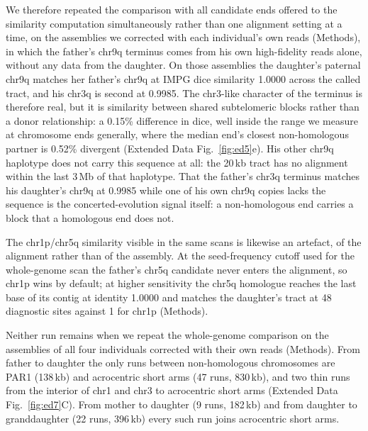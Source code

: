 \documentclass[pdflatex,mathphys]{jnl}
\begin{document}
We therefore repeated the comparison with all candidate ends offered to the similarity computation
simultaneously rather than one alignment setting at a time, on the assemblies we corrected with each
individual's own reads (Methods), in which the father's chr9q terminus comes from his own high-fidelity
reads alone, without any data from the daughter. On those assemblies the daughter's
paternal chr9q matches her father's chr9q at IMPG dice similarity 1.0000 across the called tract, and his chr3q is
second at 0.9985. The chr3-like character of the terminus is therefore real, but it
is similarity between shared subtelomeric blocks rather than a donor relationship: a 0.15\%
difference in dice, well inside the range we measure at chromosome ends generally, where the
median end's closest non-homologous partner is 0.52\% divergent (Extended Data Fig.~\ref{fig:ed5}e).
His other chr9q haplotype does not carry this sequence at all: the 20\,kb tract has no alignment within
the last 3\,Mb of that haplotype. That the father's chr3q terminus matches his daughter's chr9q at 0.9985
while one of his own chr9q copies lacks the sequence is the concerted-evolution signal itself: a
non-homologous end carries a block that a homologous end does not.

The chr1p/chr5q similarity visible in the same scans is likewise an artefact, of the alignment rather
than of the assembly. At the seed-frequency cutoff used for the whole-genome scan the father's chr5q
candidate never enters the alignment, so chr1p wins by default; at higher sensitivity the chr5q
homologue reaches the last base of its contig at identity 1.0000 and matches the daughter's tract at 48
diagnostic sites against 1 for chr1p (Methods).

Neither run remains when we repeat the whole-genome comparison on the assemblies of all four
individuals corrected with their own reads (Methods). From father to daughter the only runs between
non-homologous chromosomes are PAR1 (138\,kb) and acrocentric short arms (47 runs, 830\,kb), and
two thin runs from the interior of chr1 and chr3 to acrocentric short arms (Extended Data
Fig.~\ref{fig:ed7}C). From mother to daughter (9 runs, 182\,kb) and from daughter to granddaughter
(22 runs, 396\,kb) every such run joins acrocentric short arms.
\end{document}
